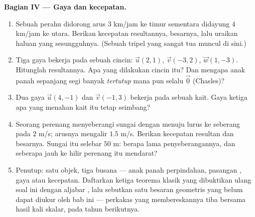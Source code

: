 \begin{problem}
\medskip
\noindent\textbf{Bagian IV --- Gaya dan kecepatan.}
\begin{enumerate}[resume]
  \item Sebuah perahu didorong arus $3$ km/jam ke timur
        sementara didayung $4$ km/jam ke utara. Berikan 
        kecepatan resultannya, besarnya, lalu uraikan haluan yang
        sesungguhnya. (Sebuah tripel yang sangat tua muncul di sini.)
  \item Tiga gaya bekerja pada sebuah cincin: $\vec u(2, 1)$,
        $\vec v(-3, 2)$, $\vec w(1, -3)$. Hitunglah resultannya.
        Apa yang dilakukan cincin itu? Dan mengapa  anak panah
        sepanjang segi banyak \emph{tertutup} mana pun selalu $\vec 0$
        (Chasles)?
  \item Dua gaya $\vec u(4, -1)$ dan $\vec v(-1, 3)$ bekerja pada sebuah
        kait. Gaya ketiga apa yang menahan kait itu tetap seimbang?
  \item Seorang perenang menyeberangi sungai dengan menuju lurus ke seberang
        pada $2$ m/s; arusnya mengalir $1.5$ m/s. Berikan
        kecepatan resultan dan besarnya. Sungai itu selebar
        $50$ m: berapa lama penyeberangannya, dan seberapa
        jauh ke hilir perenang itu mendarat?
  \item Penutup: satu objek, tiga busana --- anak panah
        perpindahan, pasangan , gaya atau kecepatan. Daftarkan
        ketiga teorema klasik yang dibuktikan ulang soal ini dengan
        aljabar , lalu sebutkan satu besaran geometris yang belum
        dapat diukur oleh  bab ini --- perkakas yang membereskannya
        tiba bersama hasil kali skalar, pada tahun berikutnya.

\end{enumerate}
\end{problem}
